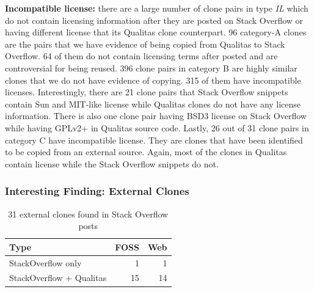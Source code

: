\documentclass{sig-alternate-05-2015}
\begin{document}
\textbf{Incompatible license:} there are a large number of clone pairs in type \textit{IL} which do not contain licensing information after they are posted on Stack Overflow or having different license that its Qualitas clone counterpart. 96 category-A clones are the pairs that we have evidence of being copied from Qualitas to Stack Overflow. 64 of them do not contain licensing terms after posted and are controversial for being reused. 396 clone pairs in category B are highly similar clones that we do not have evidence of copying. 315 of them have incompatible licenses. Interestingly, there are 21 clone pairs that Stack Overflow snippets contain Sun and MIT-like license while Qualitas clones do not have any license information. There is also one clone pair having BSD3 license on Stack Overflow while having GPLv2+ in Qualitas source code. Lastly, 26 out of 31 clone pairs in category C have incompatible license. They are clones that have been identified to be copied from an external source. Again, most of the clones in Qualitas contain license while the Stack Overflow snippets do not. 

\subsubsection{Interesting Finding: External Clones}

\begin{table}[]
	\centering
	\caption{31 external clones found in Stack Overflow posts}
	\label{tab:ext_clones}
	\begin{tabular}{l|r|r}
		\hline
		Type        & FOSS & Web \\ \hline
		StackOverflow only     & 1    & 1   \\
		StackOverflow + Qualitas & 15   & 14  \\ \hline
	\end{tabular}
\end{table}
\end{document}
